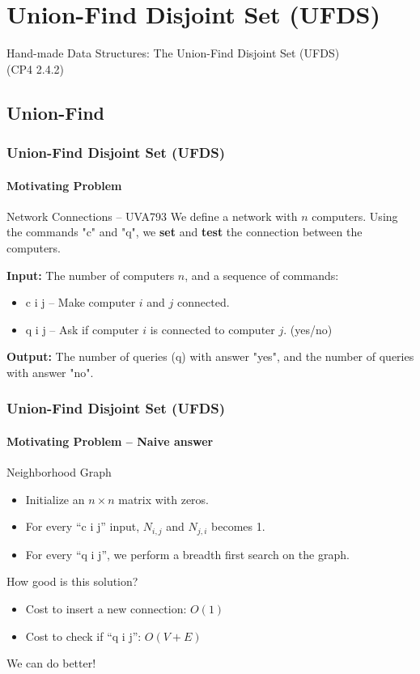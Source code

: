 \section{Union-Find Disjoint Set (UFDS)}
\begin{frame}
  \begin{center}
    Hand-made Data Structures: The Union-Find Disjoint Set (UFDS)\\
    (CP4 2.4.2)
  \end{center}
\end{frame}


\subsection{Union-Find}
\begin{frame}
  \frametitle{Union-Find Disjoint Set (UFDS)}
  \framesubtitle{Motivating Problem}

  \begin{block}{Network Connections -- UVA793}
    We define a network with $n$ computers. Using the commands "c" and "q", we {\bf set} and {\bf test} the connection between the computers.
    \bigskip

    {\bf Input:} The number of computers $n$, and a sequence of commands:
    \begin{itemize}
    \item c i j -- Make computer $i$ and $j$ connected.
    \item q i j -- Ask if computer $i$ is connected to computer $j$. (yes/no)
    \end{itemize}

    \bigskip
    {\bf Output:} The number of queries (q) with answer "yes", and the number
    of queries with answer "no".
  \end{block}
\end{frame}

\begin{frame}
  \frametitle{Union-Find Disjoint Set (UFDS)}
  \framesubtitle{Motivating Problem -- Naive answer}

  \begin{block}{Neighborhood Graph}
    \begin{itemize}
    \item Initialize an $n\times n$ matrix with zeros.
    \item For every ``c i j'' input, $N_{i,j}$ and $N_{j,i}$ becomes 1.
    \item For every ``q i j'', we perform a breadth first search on the graph.
    \end{itemize}
  \end{block}


  \bigskip

  How good is this solution?
  \begin{itemize}
  \item Cost to insert a new connection: $O(1)$
  \item Cost to check if ``q i j'': $O(V+E)$
  \end{itemize}

  \bigskip We can do better!
\end{frame}

